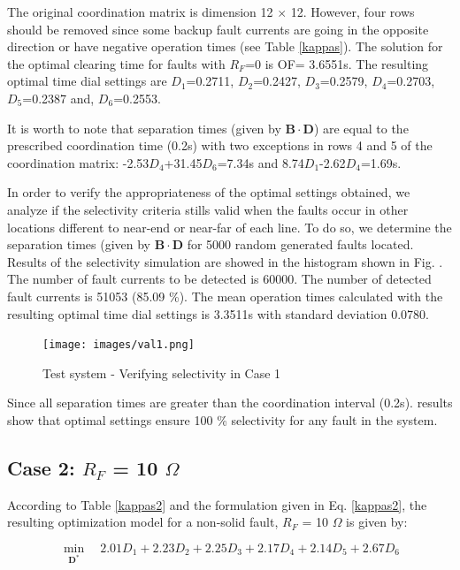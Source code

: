 \documentclass[letterpaper, 10 pt, conference]{IEEEtran}
\begin{document}
The original coordination matrix is dimension 12 $\times$ 12. However, four rows should be removed since some backup fault currents are going in the opposite direction or have negative operation times (see Table \ref{kappas}). The solution for the optimal clearing time for faults with $R_F$=0 is OF= 3.6551s. The resulting optimal time dial settings are   $D_1$=0.2711,
    $D_2$=0.2427,
    $D_3$=0.2579,
    $D_4$=0.2703,
    $D_5$=0.2387 and,
    $D_6$=0.2553.

It is worth to note that separation times (given by $\mathbf{B}\cdot \mathbf{D}$) are equal to the prescribed coordination time (0.2s) with two exceptions  in rows 4 and 5 of the coordination matrix: -2.53$D_4$+31.45$D_6$=7.34s and   8.74$D_1$-2.62$D_4$=1.69s.

In order to verify the appropriateness of the optimal settings obtained, we analyze if the selectivity criteria stills valid when the faults occur in other locations different to near-end or near-far of each line. To do so, we  determine the separation times (given by $\mathbf{B}\cdot \mathbf{D}$ for 5000 random generated faults located. Results of the selectivity simulation are showed in the histogram shown in Fig. \label{figure5x}. The number of fault currents to be detected is 60000.
The number of detected fault currents is  51053 (85.09 \%). The mean operation times calculated with the resulting optimal time dial settings is 3.3511s with standard deviation
 0.0780.

 \begin{figure}[t!] \centerline{
     \texttt{[image: images/val1.png]}}
       \caption{Test system - Verifying selectivity in Case 1}
      \label{figure5x}
        \end{figure}

        Since all separation times are greater than the coordination interval (0.2s). results show that optimal settings ensure 100 \% selectivity for any fault in the system.

\subsection{Case 2: $R_F$ = 10 $\Omega$}\label{2}

 According to Table \ref{kappas2} and the formulation given in Eq. \ref{kappas2}, the resulting optimization model for  a non-solid fault, $R_F$ = 10 $\Omega$  is given by:

\scriptsize
\begin{equation}\nonumber
   \min_{\mathbf{D^*}}\quad 2.01 D_1+2.23   D_2+2.25  D_3+2.17  D_4+ 2.14   D_5+2.67 D_6
\end{equation}
\end{document}
